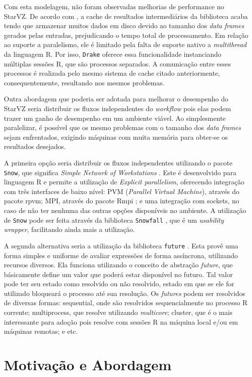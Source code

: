 Com esta modelagem, não foram observadas melhorias de performance no StarVZ. De 
acordo com \citet{ref:drakestarvz},
a cache de resultados intermediários da biblioteca acaba tendo que armazenar 
muitos dados em disco devido
ao tamanho dos \emph{data frames} gerados pelas entradas, prejudicando o tempo 
total de processamento.
Em relação ao suporte a paralelismo, ele é limitado pela falta de suporte 
nativo 
a \emph{multithread} da linguagem R.
Por isso, \texttt{Drake} oferece essa funcionalidade instanciando múltiplas 
sessões R, que são processos separados. A comunicação
entre esses processos é realizada pelo mesmo sistema de cache citado 
anteriormente, consequentemente, resultando nos mesmos
problemas.

Outra abordagem que poderia ser adotada para melhorar o desempenho do StarVZ 
seria distribuir os fluxos independentes
do \emph{workflow} pois elas podem trazer um ganho de desempenho em um ambiente 
viável.
Ao simplesmente paralelizar, é possível que os mesmo problemas com o tamanho 
dos 
\emph{data frames} sejam enfrentados, exigindo
máquinas com muita memória para obter-se os resultados desejados. 

A primeira opção seria distribuir os fluxos independentes utilizando o pacote 
\texttt{Snow}, que significa 
\emph{Simple Network of Workstations} \cite{ref:snow}. Este é desenvolvido para 
linguagem R e permite a utilização
de \emph{Explicit parallelism}, oferecendo integração com três interfaces de 
baixo nível: PVM (\emph{Parallel Virtual Machine}), através do pacote rpvm; 
MPI, 
através do pacote Rmpi \cite{ref:rmpi}; e uma integração com sockets, no caso 
de 
não ter nenhuma das outras 
opções disponíveis no ambiente. A utilização de \texttt{Snow} pode ser feita 
através da biblioteca \texttt{Snowfall} \cite{ref:snowfall},
que é um \emph{usability wrapper}, facilitando ainda mais a utilização.

A segunda alternativa seria a utilização da biblioteca \texttt{future} 
\cite{ref:future}. Esta provê uma forma simples e uniforme 
de avaliar expressões de forma assíncrona, utilizando recursos diversos. Ela 
funciona utilizando o conceito de abstração 
\emph{future}, que básicamente define um valor que poderá estar disponível no 
futuro. Tal valor pode ter seu estado como 
resolvido ou não resolvido, estado em que se ele for utilizado bloqueará o 
processo até sua resolução. Os \emph{futures} 
podem ser resolvidos de diversas formas: sequential, onde são resolvidos 
sequencialmente no processo R corrente; multiprocess,
que resolve utilizando \emph{multicore}; cluster, que é o mais interessante 
para 
adoção pois resolve com sessões R na máquina 
local e/ou em máquinas remotas; e etc.

\section{Motivação e Abordagem}\label{sect:motivation}
